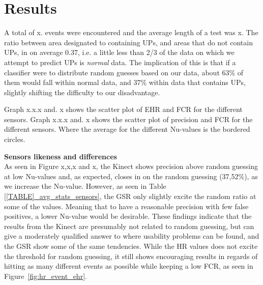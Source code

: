 \section{Results}
A total of x. events were encountered and the average length of a test was x.
The ratio between area designated to containing UPs, and areas that do not contain UPs, in on average 0.37, i.e. a
little less than 2/3 of the data on which we attempt to predict UPs is \textit{normal} data. The implication of this is
that if a classifier were to distribute random guesses based on our data, about 63\% of them would fall within normal
data, and 37\% within data that contains UPs, slightly shifting the difficulty to our disadvantage.

Graph x.x.x and. x shows the scatter plot of EHR and FCR for the different sensors. 
Graph x.x.x and. x shows the scatter plot of precision and FCR for the different sensors. Where the average for the different Nu-values is the bordered circles.



\textbf{Sensors likeness and differences}\\



As seen in Figure x,x,x and x, the Kinect shows precision above random guessing at low Nu-values and,
as expected, closes in on the random guessing (37,52\%), as we increase the Nu-value. However, as seen in Table
\ref{[TABLE]_avg_stats_sensors}, the GSR only slightly excite the random ratio at some of the values. Meaning that
to have a reasonable precision with few false positives, a lower Nu-value would be desirable.
These findings indicate that the results from the Kinect are presumably not related to random guessing, but can give a moderately qualified answer to where usability problems can be found, and the GSR show some of the same tendencies.
While the HR values does not excite the threshold for random guessing, it still shows encouraging results in regards of hitting as many different events as possible while keeping a low FCR, as seen in Figure~\ref{fig:hr_event_ehr}.




